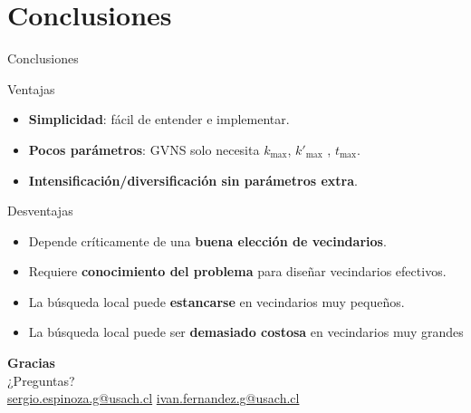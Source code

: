 \documentclass[aspectratio=169, 11pt, xcolor={dvipsnames,table}]{beamer}
\newcommand{\azul}[1]{\textcolor{UsachAzul}{#1}}
\begin{document}
\section{Conclusiones}

\begin{frame}{Conclusiones}
\vspace{-4pt}
\begin{block}{Ventajas}
\begin{itemize}
  \item \textbf{Simplicidad}: fácil de entender e implementar.
  \item \textbf{Pocos parámetros}: GVNS solo necesita $k_{\max}$, $k'_{\max}$ , $t_{\max}$.
  \item \textbf{Intensificación/diversificación sin parámetros extra}.
\end{itemize}
\end{block}

\begin{alertblock}{Desventajas}
\begin{itemize}
  \item Depende críticamente de una \textbf{buena elección de vecindarios}.
  \item Requiere \textbf{conocimiento del problema} para diseñar vecindarios efectivos.
  \item La búsqueda local puede \textbf{estancarse} en vecindarios muy pequeños.
  \item La búsqueda local puede ser \textbf{demasiado costosa} en vecindarios muy grandes
\end{itemize}
\end{alertblock}

\end{frame}


\begin{frame}[plain]
\vfill
\begin{center}
{\Huge\bfseries\azul{Gracias}}\\[10pt]
{\large ¿Preguntas?}\\[18pt]
\footnotesize
\href{mailto:sergio.espinoza.g@usach.cl}{sergio.espinoza.g@usach.cl} \quad\textbar\quad
\href{mailto:ivan.fernandez.g@usach.cl}{ivan.fernandez.g@usach.cl}
\end{center}
\vfill
\end{frame}
\end{document}
